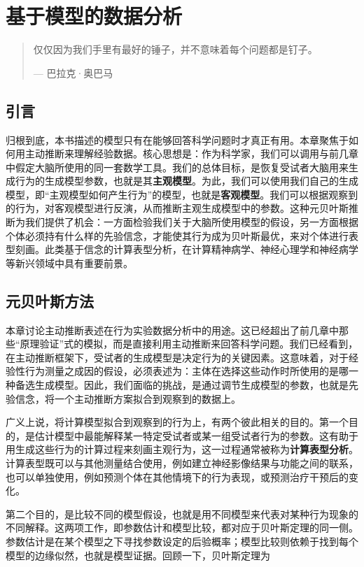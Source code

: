 \chapter{基于模型的数据分析}

\begin{quote}
仅仅因为我们手里有最好的锤子，并不意味着每个问题都是钉子。

--- 巴拉克·奥巴马
\end{quote}

\section{引言}

归根到底，本书描述的模型只有在能够回答科学问题时才真正有用。本章聚焦于如何用主动推断来理解经验数据。核心思想是：作为科学家，我们可以调用与前几章中假定大脑所使用的同一套数学工具。我们的总体目标，是恢复受试者大脑用来生成行为的生成模型参数，也就是其\textbf{主观模型}。为此，我们可以使用我们自己的生成模型，即“主观模型如何产生行为”的模型，也就是\textbf{客观模型}。我们可以根据观察到的行为，对客观模型进行反演，从而推断主观生成模型中的参数。这种元贝叶斯推断为我们提供了机会：一方面检验我们关于大脑所使用模型的假设，另一方面根据个体必须持有什么样的先验信念，才能使其行为成为贝叶斯最优，来对个体进行表型刻画。此类基于信念的计算表型分析，在计算精神病学、神经心理学和神经病学等新兴领域中具有重要前景。

\section{元贝叶斯方法}

本章讨论主动推断表述在行为实验数据分析中的用途。这已经超出了前几章中那些“原理验证”式的模拟，而是直接利用主动推断来回答科学问题。我们已经看到，在主动推断框架下，受试者的生成模型是决定行为的关键因素。这意味着，对于经验性行为测量之成因的假设，必须表述为：主体在选择这些动作时所使用的是哪一种备选生成模型。因此，我们面临的挑战，是通过调节生成模型的参数，也就是先验信念，将一个主动推断方案拟合到观察到的数据上。

广义上说，将计算模型拟合到观察到的行为上，有两个彼此相关的目的。第一个目的，是估计模型中最能解释某一特定受试者或某一组受试者行为的参数。这有助于用生成这些行为的计算过程来刻画主观行为，这一过程通常被称为\textbf{计算表型分析}。计算表型既可以与其他测量结合使用，例如建立神经影像结果与功能之间的联系，也可以单独使用，例如预测个体在其他情境下的行为表现，或预测治疗干预后的变化。

第二个目的，是比较不同的模型假设，也就是用不同模型来代表对某种行为现象的不同解释。这两项工作，即参数估计和模型比较，都对应于贝叶斯定理的同一侧。参数估计是在某个模型之下寻找参数设定的后验概率；模型比较则依赖于找到每个模型的边缘似然，也就是模型证据。回顾一下，贝叶斯定理为

